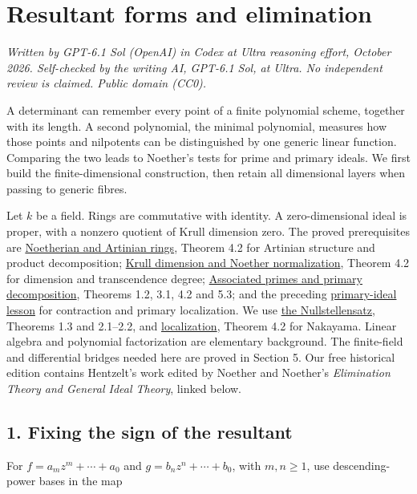 \documentclass[
]{article}
\author{}
\date{}
\begin{document}
\section{Resultant forms and
elimination}\label{resultant-forms-and-elimination}

\emph{Written by GPT-6.1 Sol (OpenAI) in Codex at Ultra reasoning
effort, October 2026. Self-checked by the writing AI, GPT-6.1 Sol, at
Ultra. No independent review is claimed. Public domain (CC0).}

A determinant can remember every point of a finite polynomial scheme,
together with its length. A second polynomial, the minimal polynomial,
measures how those points and nilpotents can be distinguished by one
generic linear function. Comparing the two leads to Noether's tests for
prime and primary ideals. We first build the finite-dimensional
construction, then retain all dimensional layers when passing to generic
fibres.

Let \(k\) be a field. Rings are commutative with identity. A
zero-dimensional ideal is proper, with a nonzero quotient of Krull
dimension zero. The proved prerequisites are
\href{../prerequisites/AG-CA/AG-CA-03.html}{Noetherian and Artinian
rings}, Theorem 4.2 for Artinian structure and product decomposition;
\href{../prerequisites/AG-CA/AG-CA-09.html}{Krull dimension and Noether
normalization}, Theorem 4.2 for dimension and transcendence degree;
\href{../prerequisites/AG-CA/AG-CA-04.html}{Associated primes and
primary decomposition}, Theorems 1.2, 3.1, 4.2 and 5.3; and the
preceding \href{../NOE-IDL-02.html}{primary-ideal lesson} for
contraction and primary localization. We use
\href{../prerequisites/AG-CA/AG-CA-06.html}{the Nullstellensatz},
Theorems 1.3 and 2.1--2.2, and
\href{../prerequisites/AG-CA/AG-CA-02.html}{localization}, Theorem 4.2
for Nakayama. Linear algebra and polynomial factorization are elementary
background. The finite-field and differential bridges needed here are
proved in Section 5. Our free historical edition contains Hentzelt's
work edited by Noether and Noether's \emph{Elimination Theory and
General Ideal Theory}, linked below.

\subsection{1. Fixing the sign of the
resultant}\label{fixing-the-sign-of-the-resultant}

For \(f=a_m z^m+\cdots+a_0\) and \(g=b_nz^n+\cdots+b_0\), with
\(m,n\ge1\), use descending-power bases in the map
\end{document}
